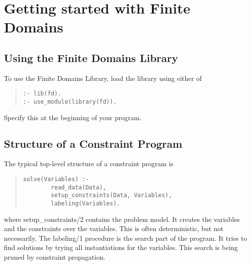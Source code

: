 %
% 
% 
% 
% 

\chapter{Getting started with Finite Domains}

\section{Using the Finite Domains Library}
To use the Finite Domains Library, load the library using either of
\begin{quote}\begin{verbatim}
:- lib(fd).
:- use_module(library(fd)).
\end{verbatim}\end{quote}
Specify this at the beginning of your program.

\section{Structure of a Constraint Program}
The typical top-level structure of a constraint program is
\begin{quote}\begin{verbatim}
solve(Variables) :-
        read_data(Data),
        setup_constraints(Data, Variables),
        labeling(Variables).
\end{verbatim}\end{quote}
where setup_constraints/2 contains the problem model. It creates the
variables and the constraints over the variables.
This is often deterministic, but not necessarily.
The labeling/1 procedure is the search part of the program. It
tries to find solutions by trying all instantiations for the
variables. This search is being pruned by constraint propagation.

